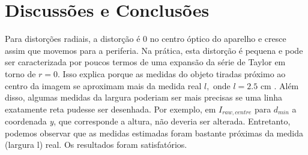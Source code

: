 \documentclass{bmvc2k}
\begin{document}
\section{Discussões e Conclusões}
\label{sec:Conclusion}
Para distorções radiais, a distorção é 0 no centro óptico do aparelho e cresce assim que movemos para a periferia. Na prática, esta distorção é pequena e pode ser caracterizada por poucos termos de uma expansão da série de Taylor em torno de $r = 0$. Isso explica porque as medidas do objeto tiradas próximo ao centro da imagem se aproximam mais da medida real $l, \mbox{ onde } l = 2.5 \mbox{ cm }$. Além disso, algumas medidas da largura poderiam ser mais precisas se uma linha exatamente reta pudesse ser desenhada. Por exemplo, em $I_{raw,centre}$ para $d_{min}$ a coordenada \textit{y}, que corresponde a altura, não deveria ser alterada. Entretanto, podemos observar que as medidas estimadas foram bastante próximas da medida (largura l) real. Os resultados foram satisfatórios. 


\end{document}
